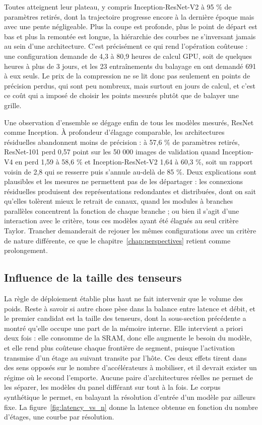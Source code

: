 \documentclass[11pt,a4paper]{report}
\begin{document}
Toutes atteignent leur plateau, y compris Inception-ResNet-V2 à 95 \% de paramètres retirés, dont la trajectoire progresse encore à la dernière époque mais avec une pente négligeable. Plus la coupe est profonde, plus le point de départ est bas et plus la remontée est longue, la hiérarchie des courbes ne s'inversant jamais au sein d'une architecture. C'est précisément ce qui rend l'opération coûteuse : une configuration demande de 4,3 à 80,9 heures de calcul GPU, soit de quelques heures à plus de 3 jours, et les 23 entraînements du balayage en ont demandé 691 à eux seuls. Le prix de la compression ne se lit donc pas seulement en points de précision perdus, qui sont peu nombreux, mais surtout en jours de calcul, et c'est ce coût qui a imposé de choisir les points mesurés plutôt que de balayer une grille.

Une observation d'ensemble se dégage enfin de tous les modèles mesurés, ResNet comme Inception. À profondeur d'élagage comparable, les architectures résiduelles abandonnent moins de précision : à 57,6 \% de paramètres retirés, ResNet-101 perd 0,57 point sur les 50 000 images de validation quand Inception-V4 en perd 1,59 à 58,6 \% et Inception-ResNet-V2 1,64 à 60,3 \%, soit un rapport voisin de 2,8 qui se resserre puis s'annule au-delà de 85 \%. Deux explications sont plausibles et les mesures ne permettent pas de les départager : les connexions résiduelles produisent des représentations redondantes et distribuées, dont on sait qu'elles tolèrent mieux le retrait de canaux, quand les modules à branches parallèles concentrent la fonction de chaque branche ; ou bien il s'agit d'une interaction avec le critère, tous ces modèles ayant été élagués au seul critère Taylor. Trancher demanderait de rejouer les mêmes configurations avec un critère de nature différente, ce que le chapitre~\ref{chap:perspectives} retient comme prolongement.

\subsection{Influence de la taille des tenseurs}
\label{sec:tenseurs}

La règle de déploiement établie plus haut ne fait intervenir que le volume des poids. Reste à savoir si autre chose pèse dans la balance entre latence et débit, et le premier candidat est la taille des tenseurs, dont la sous-section précédente a montré qu'elle occupe une part de la mémoire interne. Elle intervient a priori deux fois : elle consomme de la SRAM, donc elle augmente le besoin du modèle, et elle rend plus coûteuse chaque frontière de segment, puisque l'activation transmise d'un étage au suivant transite par l'hôte. Ces deux effets tirent dans des sens opposés sur le nombre d'accélérateurs à mobiliser, et il devrait exister un régime où le second l'emporte. Aucune paire d'architectures réelles ne permet de les séparer, les modèles du panel différant sur tout à la fois. Le corpus synthétique le permet, en balayant la résolution d'entrée d'un modèle par ailleurs fixe. La figure~\ref{fig:latency_vs_n} donne la latence obtenue en fonction du nombre d'étages, une courbe par résolution.
\end{document}
